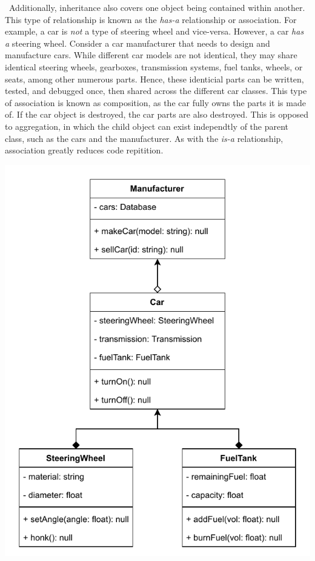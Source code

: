 \documentclass[11pt]{article}
\begin{document}
\noindent
\begin{minipage}[t]{0.5\textwidth}
    \vspace{0pt}
    \, Additionally, inheritance also covers one object being contained within another. This type of relationship is known as the \textit{has-a} relationship or association. For example, a car is \textit{not} a type of steering wheel and vice-versa. However, a car \textit{has a} steering wheel. Consider a car manufacturer that needs to design and manufacture cars. While different car models are not identical, they may share identical steering wheels, gearboxes, transmission systems, fuel tanks, wheels, or seats, among other numerous parts. Hence, these identicial parts can be written, tested, and debugged once, then shared across the different car classes. This type of association is known as composition, as the car fully owns the parts it is made of. If the car object is destroyed, the car parts are also destroyed. This is opposed to aggregation, in which the child object can exist independtly of the parent class, such as the cars and the manufacturer. As with the \textit{is-a} relationship, association greatly reduces code repitition.
\end{minipage}
\begin{minipage}[t]{0.5\textwidth}
    \vspace{0pt}
    \includegraphics[width=\textwidth]{figures/association.pdf}
    \label{fig:association-uml}
\end{minipage}
\end{document}

